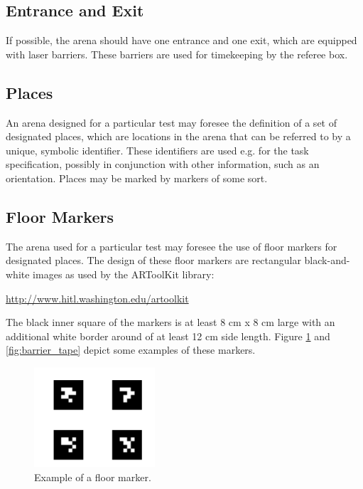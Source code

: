 \subsection{Entrance and Exit}
If possible, the arena should have one entrance and one exit, which are equipped with laser barriers. These barriers are used for timekeeping by the referee box.



\subsection{Places}
An arena designed for a particular test may foresee the definition of a set of designated places, which are locations in the arena that can be referred to by a unique, symbolic identifier. These identifiers are used e.g. for the task specification, possibly in conjunction with other information, such as an orientation. Places may be marked by markers of some sort.


\subsection{Floor Markers}
The arena used for a particular test may foresee the use of floor markers for designated places. The design of these floor markers are rectangular black-and-white images as used by the ARToolKit library:
\begin{center}
\url{http://www.hitl.washington.edu/artoolkit}
\end{center}

The black inner square of the markers is at least 8 cm x 8 cm large with an additional white border around of at least 12 cm side length. Figure \ref{fig:floor_marker} and \ref{fig:barrier_tape} depict some examples of these markers.

\begin{figure} [h!]
\centering
\includegraphics[width= 0.4\textwidth ]{./images/example_floor_marker.png}
\caption{Example of a floor marker.}
\label{fig:floor_marker}
\end{figure}


